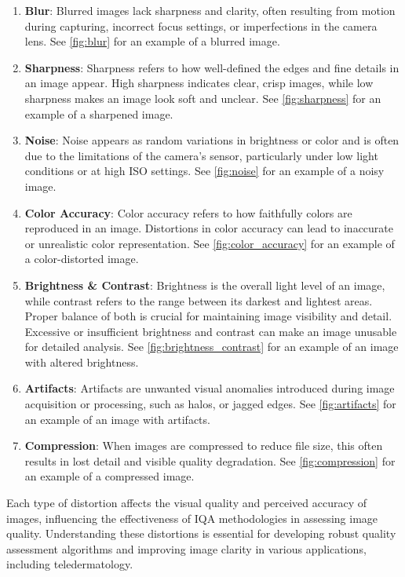 \begin{enumerate}
    \item \textbf{Blur}: Blurred images lack sharpness and clarity, often resulting from motion during capturing, incorrect focus settings, or imperfections in the camera lens. See \autoref{fig:blur} for an example of a blurred image.
    \item \textbf{Sharpness}: Sharpness refers to how well-defined the edges and fine details in an image appear. High sharpness indicates clear, crisp images, while low sharpness makes an image look soft and unclear. See \autoref{fig:sharpness} for an example of a sharpened image.
    \item \textbf{Noise}: Noise appears as random variations in brightness or color and is often due to the limitations of the camera’s sensor, particularly under low light conditions or at high ISO settings. See \autoref{fig:noise} for an example of a noisy image.
    \item \textbf{Color Accuracy}:  Color accuracy refers to how faithfully colors are reproduced in an image. Distortions in color accuracy can lead to inaccurate or unrealistic color representation. See \autoref{fig:color_accuracy} for an example of a color-distorted image.
    \item \textbf{Brightness \& Contrast}: Brightness is the overall light level of an image, while contrast refers to the range between its darkest and lightest areas. Proper balance of both is crucial for maintaining image visibility and detail. Excessive or insufficient brightness and contrast can make an image unusable for detailed analysis. See \autoref{fig:brightness_contrast} for an example of an image with altered brightness.
    \item \textbf{Artifacts}: Artifacts are unwanted visual anomalies introduced during image acquisition or processing, such as halos, or jagged edges. See \autoref{fig:artifacts} for an example of an image with artifacts.
    \item \textbf{Compression}: When images are compressed to reduce file size, this often results in lost detail and visible quality degradation. See \autoref{fig:compression} for an example of a compressed image.
\end{enumerate}
Each type of distortion affects the visual quality and perceived accuracy of images, influencing the effectiveness of IQA methodologies in assessing image quality. Understanding these distortions is essential for developing robust quality assessment algorithms and improving image clarity in various applications, including teledermatology. \par

